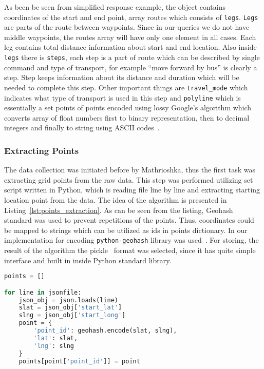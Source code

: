As been be seen from simplified response example, the object contains coordinates of the
start and end point, array routes which consists of \texttt{legs}. \texttt{Legs} are parts of the
route between waypoints. Since in our queries we do not have middle waypoints, the routes array will have
only one element in all cases. Each leg contains total distance information about start and end
location. Also inside \texttt{legs} there is \texttt{steps}, each step is a part of route
which can be described by single command and type of transport, for example ``move forward by bus''
is clearly a step. Step keeps information about its distance and duration which will be needed
to complete this step. Other important things are \texttt{travel\_mode} which indicates what
type of transport is used in this step and \texttt{polyline} which is essentially a set points
of points encoded using lossy Google's algorithm which converts array of float numbers first
to binary representation, then to decimal integers and finally to string using ASCII
codes~\cite{google:polyline}.

\subsubsection{Extracting Points}
The data collection was initiated before by Mathrioshka, thus the first task was extracting
grid points from the raw data. This step was performed utilizing set script written in Python, which
is reading file line by line and extracting starting location point from the data. The
idea of the algorithm is presented in Listing~\ref{lst:points_extraction}. As can be seen from
the listing, Geohash~\cite{wiki:geohash} standard was used to prevent repetitions of the points.
Thus, coordinates could be mapped to strings which can be utilized as ids in points dictionary.
In our implementation for encoding \lstinline{python-geohash} library was used~\cite{pip:geohash}.
For storing, the result of the algorithm the pickle~\cite{pickle} format was selected, since it has
quite simple interface and built in inside Python standard library.

\begin{lstlisting}[language=python, caption=Points extraction, label={lst:points_extraction}]
points = []

for line in jsonfile:
    json_obj = json.loads(line)
    slat = json_obj['start_lat']
    slng = json_obj['start_long']
    point = {
        'point_id': geohash.encode(slat, slng),
        'lat': slat,
        'lng': slng
    }
    points[point['point_id']] = point
\end{lstlisting}

